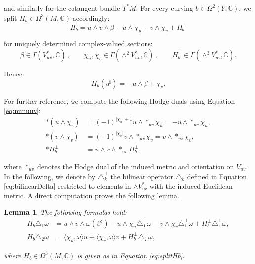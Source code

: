 \documentclass[10pt,a4paper,twoside,reqno]{amsart}
\theoremstyle{plain}
\newtheorem{lemma}[thm]{Lemma}
\theoremstyle{definition}
\theoremstyle{remark}
\def\C{\mathbb{C}}
\begin{document}
\noindent
and similarly for the cotangent bundle $T^{\ast}M$. For every curving $b\in \Omega^2(Y , \mathbb{C})$, we split $H_b \in \Omega^3(M ,\C)$ accordingly:
\begin{equation}
\label{eq:splitHb}
H_b = u\wedge v \wedge \beta + u \wedge \chi_u + v\wedge \chi_v + H_b^{\perp}
\end{equation}

\noindent
for uniquely determined complex-valued sections:
\begin{equation*}
\beta \in \Gamma(V_{uv}^{\ast} , \mathbb{C}) \, , \qquad \chi_u , \chi_v \in \Gamma(\wedge^2 V_{uv}^{\ast} ,\mathbb{C})\, , \qquad H_b^{\perp} \in \Gamma(\wedge^3 V_{uv}^{\ast} , \mathbb{C}).
\end{equation*}

\noindent
Hence:
\begin{equation*}
H_b(u^{\sharp}) = - u \wedge \beta + \chi_v.
\end{equation*}

\noindent
For further reference, we compute the following Hodge duals using Equation \eqref{eq:nunuuv}:
\begin{align}
\ast(u \wedge \chi_u) &= (-1)^{\vert \chi_u \vert + 1} u\wedge \ast_{uv} \chi_u = - u\wedge \ast_{uv} \chi_u, \nonumber\\
\ast(v \wedge \chi_v) &= (-1)^{\vert \chi_v \vert } v\wedge \ast_{uv} \chi_v = v \wedge \ast_{uv} \chi_v, \label{eq:Hodgeidentities}\\
\ast H_b^{\perp} &= u\wedge v \wedge \ast_{uv} H_b^{\perp}, \nonumber
\end{align}

\noindent
where $\ast_{uv}$ denotes the Hodge dual of the induced metric and orientation on $V_{uv}$. In the following, we denote by $\triangle^{\perp}_k$ the bilinear operator $\triangle_k$ defined in Equation \eqref{eq:bilinearDelta} restricted to elements in $\wedge V_{uv}^{\ast}$ with the induced Euclidean metric. A direct computation proves the following lemma.

\begin{lemma}
\label{lemma:HDeltaomega}
The following formulas hold:
\begin{align*}
H_b \triangle_1 \omega &= u\wedge v \wedge \omega(\beta^{\sharp}) - u \wedge \chi_u \triangle^{\perp}_1 \omega -  v \wedge \chi_v \triangle^{\perp}_1 \omega + H_b^{\perp} \triangle^{\perp}_1 \omega,\\
H_b \triangle_2 \omega &=  \langle \chi_u , \omega\rangle u +  \langle \chi_v , \omega \rangle v + H_b^{\perp} \triangle^{\perp}_2 \omega,
\end{align*}

\noindent
where $H_b \in \Omega^3(M ,\C)$ is given as in Equation \eqref{eq:splitHb}.
\end{lemma}
\end{document}
